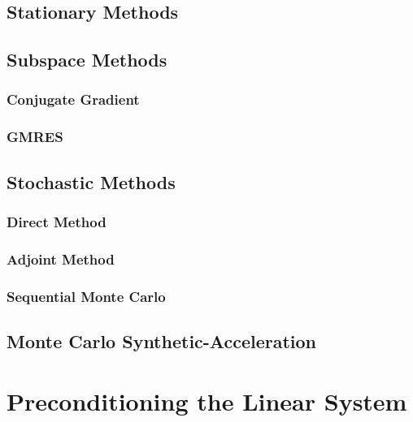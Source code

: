\subsection{Stationary Methods}
\label{subsec:stationary_methods}

\subsection{Subspace Methods}
\label{subsec:subspace_methods}

\subsubsection{Conjugate Gradient}
\label{subsubsec:conjugate_gradient}

\subsubsection{GMRES}
\label{subsubsec:gmres}

\subsection{Stochastic Methods}
\label{subsec:stochastic_methods}

\subsubsection{Direct Method}
\label{subsubsec:direct_mc}

\subsubsection{Adjoint Method}
\label{subsubsec:adjoint_mc}

\subsubsection{Sequential Monte Carlo}
\label{subsusbsec:sequential_mc}

\subsection{Monte Carlo Synthetic-Acceleration}
\label{subsec:mcsa}

\section{Preconditioning the Linear System}
\label{sec:linear_preconditioning}

